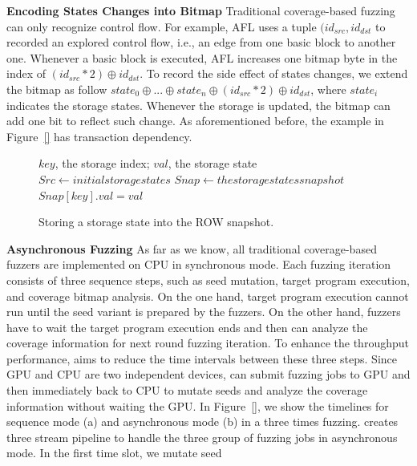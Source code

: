 \noindent \textbf{Encoding States Changes into Bitmap}
Traditional coverage-based fuzzing can only recognize control flow. For example, AFL uses a tuple $(id_{src}, id_{dst}$ to recorded an explored control flow, i.e., an edge from one basic block to another one. Whenever a basic block is executed, AFL increases one bitmap byte in the index of $(id_{src} * 2) \oplus id_{dst}$. 
To record the side effect of states changes, we extend the bitmap as follow $state_0 \oplus ... \oplus state_n \oplus (id_{src} * 2) \oplus id_{dst}$, where $state_i$ indicates the storage states. 
Whenever the storage is updated, the bitmap can add one bit to reflect such change. 
As aforementioned before, the example in Figure~\ref{} has transaction dependency.  



\begin{figure}[t]
\begin{algorithm}[H]
\caption{Storing a storage state into the ROW snapshot.}
\label{algo:row_sstore}
\begin{algorithmic}[1]
    \Require $key$, the storage index; $val$, the storage state
    \State $Src \gets initial storage states$
    \State $Snap \gets the storage states snapshot$
        \State $Snap[key].val = val$
        \State \Return
    \EndIf
\end{algorithmic}
\end{algorithm}
\end{figure}


\noindent \textbf{Asynchronous Fuzzing}
As far as we know, all traditional coverage-based fuzzers are implemented on CPU in synchronous mode. Each fuzzing iteration consists of three sequence steps, such as seed mutation, target program execution, and coverage bitmap analysis. 
On the one hand, target program execution cannot run until the seed variant is prepared by the fuzzers. 
On the other hand, fuzzers have to wait the target program execution ends and then can analyze the coverage information for next round fuzzing iteration. 
To enhance the throughput performance, {\tool} aims to reduce the time intervals between these three steps.
Since GPU and CPU are two independent devices, {\runner} can submit fuzzing jobs to GPU and then immediately back to CPU to mutate seeds and analyze the coverage information without waiting the GPU. 
In Figure~\ref{}, we show the timelines for sequence mode (a) and asynchronous mode (b) in a three times fuzzing. 
{\tool} creates three stream pipeline to handle the three group of fuzzing jobs in asynchronous mode. 
In the first time slot, we mutate seed  

